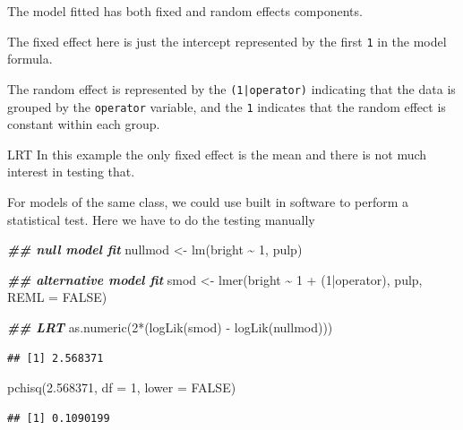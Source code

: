 \documentclass[
  ignorenonframetext,
]{beamer}
\newenvironment{Shaded}{\begin{snugshade}}{\end{snugshade}}
\newcommand{\AttributeTok}[1]{\textcolor[rgb]{0.77,0.63,0.00}{#1}}
\newcommand{\ConstantTok}[1]{\textcolor[rgb]{0.00,0.00,0.00}{#1}}
\newcommand{\DecValTok}[1]{\textcolor[rgb]{0.00,0.00,0.81}{#1}}
\newcommand{\DocumentationTok}[1]{\textcolor[rgb]{0.56,0.35,0.01}{\textbf{\textit{#1}}}}
\newcommand{\FloatTok}[1]{\textcolor[rgb]{0.00,0.00,0.81}{#1}}
\newcommand{\FunctionTok}[1]{\textcolor[rgb]{0.00,0.00,0.00}{#1}}
\newcommand{\NormalTok}[1]{#1}
\newcommand{\OtherTok}[1]{\textcolor[rgb]{0.56,0.35,0.01}{#1}}
\newcommand{\SpecialCharTok}[1]{\textcolor[rgb]{0.00,0.00,0.00}{#1}}
\begin{document}
\begin{frame}{}
\protect\hypertarget{section-3}{}
The model fitted has both fixed and random effects components.

The fixed effect here is just the intercept represented by the first
\texttt{1} in the model formula.

The random effect is represented by the \texttt{(1|operator)} indicating
that the data is grouped by the \texttt{operator} variable, and the
\texttt{1} indicates that the random effect is constant within each
group.
\end{frame}

\begin{frame}[fragile]{LRT}
\protect\hypertarget{lrt}{}
In this example the only fixed effect is the mean and there is not much
interest in testing that.

For models of the same class, we could use built in software to perform
a statistical test. Here we have to do the testing manually

\vspace{12pt}
\small

\begin{Shaded}
\begin{Highlighting}[]
\DocumentationTok{\#\# null model fit}
\NormalTok{nullmod }\OtherTok{\textless{}{-}} \FunctionTok{lm}\NormalTok{(bright }\SpecialCharTok{\textasciitilde{}} \DecValTok{1}\NormalTok{, pulp) }

\DocumentationTok{\#\# alternative model fit}
\NormalTok{smod }\OtherTok{\textless{}{-}} \FunctionTok{lmer}\NormalTok{(bright }\SpecialCharTok{\textasciitilde{}} \DecValTok{1} \SpecialCharTok{+}\NormalTok{ (}\DecValTok{1}\SpecialCharTok{|}\NormalTok{operator), pulp, }\AttributeTok{REML =} \ConstantTok{FALSE}\NormalTok{)}

\DocumentationTok{\#\# LRT}
\FunctionTok{as.numeric}\NormalTok{(}\DecValTok{2}\SpecialCharTok{*}\NormalTok{(}\FunctionTok{logLik}\NormalTok{(smod) }\SpecialCharTok{{-}} \FunctionTok{logLik}\NormalTok{(nullmod)))}
\end{Highlighting}
\end{Shaded}

\begin{verbatim}
## [1] 2.568371
\end{verbatim}

\begin{Shaded}
\begin{Highlighting}[]
\FunctionTok{pchisq}\NormalTok{(}\FloatTok{2.568371}\NormalTok{, }\AttributeTok{df =} \DecValTok{1}\NormalTok{, }\AttributeTok{lower =} \ConstantTok{FALSE}\NormalTok{)}
\end{Highlighting}
\end{Shaded}

\begin{verbatim}
## [1] 0.1090199
\end{verbatim}
\end{frame}
\end{document}

